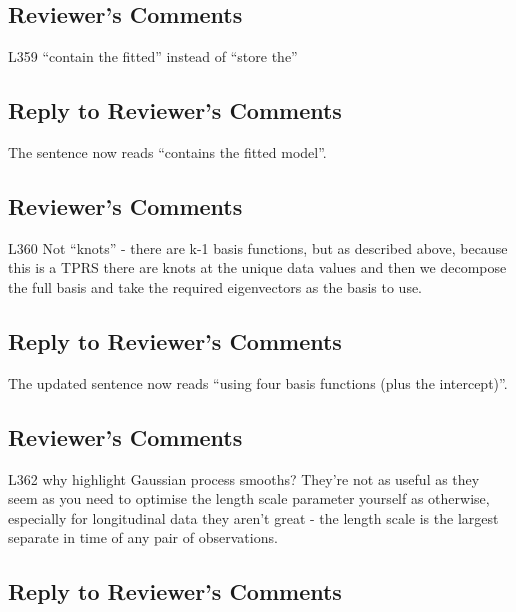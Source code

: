 \documentclass[
]{article}
\begin{document}
\hypertarget{reviewers-comments-27}{%
\subsection{Reviewer's Comments}\label{reviewers-comments-27}}

L359 ``contain the fitted'' instead of ``store the''

\hypertarget{section-28}{%
\subsection{\texorpdfstring{\textcolor{reviewersblue} {Reply to Reviewer's Comments}}{}}\label{section-28}}

The sentence now reads ``contains the fitted model''.

\hypertarget{reviewers-comments-28}{%
\subsection{Reviewer's Comments}\label{reviewers-comments-28}}

L360 Not ``knots'' - there are k-1 basis functions, but as described above, because this is a TPRS there are knots at the unique data values and then we decompose the full basis and take the required eigenvectors as the basis to use.

\hypertarget{section-29}{%
\subsection{\texorpdfstring{\textcolor{reviewersblue} {Reply to Reviewer's Comments}}{}}\label{section-29}}

The updated sentence now reads ``using four basis functions (plus the intercept)''.

\hypertarget{reviewers-comments-29}{%
\subsection{Reviewer's Comments}\label{reviewers-comments-29}}

L362 why highlight Gaussian process smooths? They're not as useful as they seem as you need to optimise the length scale parameter yourself as otherwise, especially for longitudinal data they aren't great - the length scale is the largest separate in time of any pair of observations.

\hypertarget{section-30}{%
\subsection{\texorpdfstring{\textcolor{reviewersblue} {Reply to Reviewer's Comments}}{}}\label{section-30}}
\end{document}

